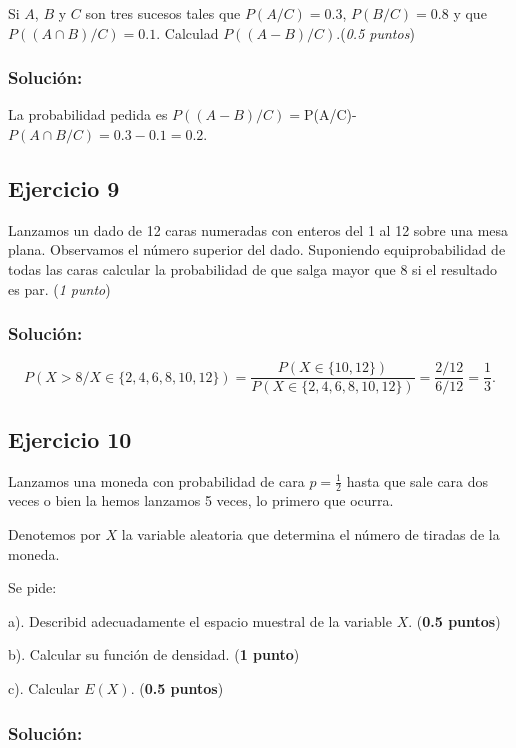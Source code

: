 \documentclass[
]{article}
\begin{document}
Si \(A\), \(B\) y \(C\) son tres sucesos tales que \(P(A/C)= 0.3\),
\(P(B/C)=0.8\) y que \(P((A\cap B)/C)=0.1\). Calculad
\(P((A-B)/C)\).(\emph{0.5 puntos})

\hypertarget{soluciuxf3n-7}{%
\subsubsection{Solución:}\label{soluciuxf3n-7}}

La probabilidad pedida es
\(P((A-B)/C)=\)P(A/C)-\(P(A\cap B/C)=0.3-0.1=0.2.\)

\hypertarget{ejercicio-9}{%
\subsection{Ejercicio 9}\label{ejercicio-9}}

Lanzamos un dado de 12 caras numeradas con enteros del 1 al 12 sobre una
mesa plana. Observamos el número superior del dado. Suponiendo
equiprobabilidad de todas las caras calcular la probabilidad de que
salga mayor que 8 si el resultado es par. (\emph{1 punto})

\hypertarget{soluciuxf3n-8}{%
\subsubsection{Solución:}\label{soluciuxf3n-8}}

\[ P(X>8/X\in\{2,4,6,8,10,12\})=\frac{P(X\in\{10,12\})}{P(X\in\{2,4,6,8,10,12\})}=\frac{2/12}{6/12}=\frac{1}{3}.\]

\hypertarget{ejercicio-10}{%
\subsection{Ejercicio 10}\label{ejercicio-10}}

Lanzamos una moneda con probabilidad de cara \(p=\frac{1}{2}\) hasta que
sale cara dos veces o bien la hemos lanzamos 5 veces, lo primero que
ocurra.

Denotemos por \(X\) la variable aleatoria que determina el número de
tiradas de la moneda.

Se pide:

a). Describid adecuadamente el espacio muestral de la variable \(X\).
(\textbf{0.5 puntos})

b). Calcular su función de densidad. (\textbf{1 punto})

c). Calcular \(E(X)\). (\textbf{0.5 puntos})

\hypertarget{soluciuxf3n-9}{%
\subsubsection{Solución:}\label{soluciuxf3n-9}}
\end{document}
